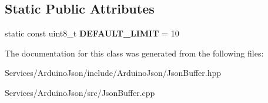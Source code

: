 \subsection*{Static Public Attributes}
\begin{DoxyCompactItemize}
\item 
\hypertarget{class_arduino_json_1_1_json_buffer_a8c353599e7f2efbc0f4c5b156918a712}{}static const uint8\+\_\+t {\bfseries D\+E\+F\+A\+U\+L\+T\+\_\+\+L\+I\+M\+I\+T} = 10\label{class_arduino_json_1_1_json_buffer_a8c353599e7f2efbc0f4c5b156918a712}

\end{DoxyCompactItemize}


The documentation for this class was generated from the following files\+:\begin{DoxyCompactItemize}
\item 
Services/\+Arduino\+Json/include/\+Arduino\+Json/Json\+Buffer.\+hpp\item 
Services/\+Arduino\+Json/src/Json\+Buffer.\+cpp\end{DoxyCompactItemize}
